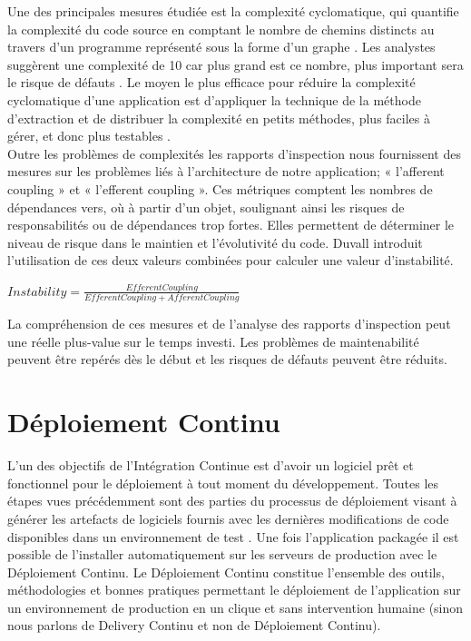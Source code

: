       Une des principales mesures étudiée est la complexité cyclomatique, qui quantifie la complexité du code source en comptant le nombre de chemins distincts au travers d'un programme représenté sous la forme d'un graphe \cite{Kan03}. Les analystes suggèrent une complexité de 10 car plus grand est ce nombre, plus important sera le risque de défauts \cite{Wat96}. Le moyen le plus efficace pour réduire la complexité cyclomatique d’une application est d'appliquer la technique de la méthode d'extraction et de distribuer la complexité en petits méthodes, plus faciles à gérer, et donc plus testables \cite{Duv07}.\\

      Outre les problèmes de complexités les rapports d’inspection nous fournissent des mesures sur les problèmes liés à l’architecture de notre application; « l’afferent coupling » et « l’efferent coupling ». Ces métriques comptent les nombres de dépendances vers, où à partir d’un objet, soulignant ainsi les risques de responsabilités ou de dépendances trop fortes. Elles permettent de déterminer le niveau de risque dans le maintien et l’évolutivité du code. Duvall introduit l'utilisation de ces deux valeurs combinées pour calculer une valeur d'instabilité.\\

      \begin{center}
          $Instability=\frac{EfferentCoupling}{EfferentCoupling + AfferentCoupling}$\\
      \end{center}

      La compréhension de ces mesures et de l'analyse des rapports d'inspection peut une réelle plus-value sur le temps investi. Les problèmes de maintenabilité peuvent être repérés dès le début et les risques de défauts peuvent être réduits.

  \section{Déploiement Continu}
  L'un des objectifs de l’Intégration Continue est d'avoir un logiciel prêt et fonctionnel pour le déploiement à tout moment du développement. Toutes les étapes vues précédemment sont des parties du processus de déploiement visant à générer les artefacts de logiciels fournis avec les dernières modifications de code disponibles dans un environnement de test \cite{Duv07}. Une fois l’application packagée il est possible de l'installer automatiquement sur les serveurs de production avec le Déploiement Continu. Le Déploiement Continu constitue l'ensemble des outils, méthodologies et bonnes pratiques permettant le déploiement de l'application sur un environnement de production en un clique et sans intervention humaine (sinon nous parlons de Delivery Continu et non de Déploiement Continu).

